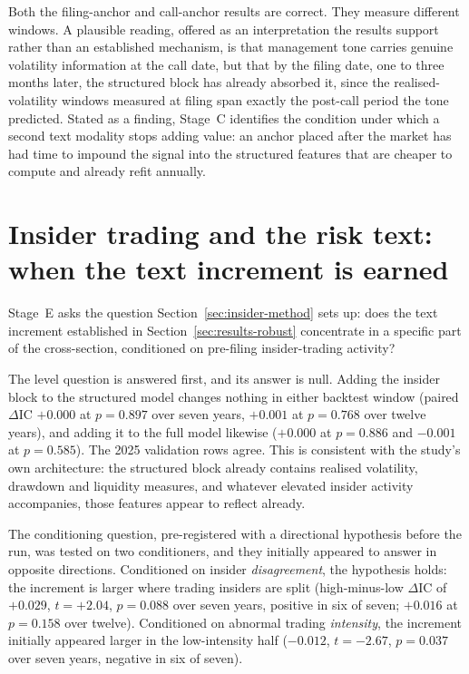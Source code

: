 \documentclass[logo,msc,ai]{infthesis}        %
\begin{document}
Both the filing-anchor and call-anchor results are correct. They measure different windows. A plausible reading, offered as an interpretation the results support rather than an established mechanism, is that management tone carries genuine volatility information at the call date, but that by the filing date, one to three months later, the structured block has already absorbed it, since the realised-volatility windows measured at filing span exactly the post-call period the tone predicted. Stated as a finding, Stage~C identifies the condition under which a second text modality stops adding value: an anchor placed after the market has had time to impound the signal into the structured features that are cheaper to compute and already refit annually.

\section{Insider trading and the risk text: when the text increment is earned}
\label{sec:results-insider}
Stage~E asks the question Section~\ref{sec:insider-method} sets up: does the text increment established in Section~\ref{sec:results-robust} concentrate in a specific part of the cross-section, conditioned on pre-filing insider-trading activity?

The level question is answered first, and its answer is null. Adding the insider block to the structured model changes nothing in either backtest window (paired $\Delta$IC $+0.000$ at $p=0.897$ over seven years, $+0.001$ at $p=0.768$ over twelve years), and adding it to the full model likewise ($+0.000$ at $p=0.886$ and $-0.001$ at $p=0.585$). The 2025 validation rows agree. This is consistent with the study's own architecture: the structured block already contains realised volatility, drawdown and liquidity measures, and whatever elevated insider activity accompanies, those features appear to reflect already.

The conditioning question, pre-registered with a directional hypothesis before the run, was tested on two conditioners, and they initially appeared to answer in opposite directions. Conditioned on insider \emph{disagreement}, the hypothesis holds: the increment is larger where trading insiders are split (high-minus-low $\Delta$IC of $+0.029$, $t=+2.04$, $p=0.088$ over seven years, positive in six of seven; $+0.016$ at $p=0.158$ over twelve). Conditioned on abnormal trading \emph{intensity}, the increment initially appeared larger in the low-intensity half ($-0.012$, $t=-2.67$, $p=0.037$ over seven years, negative in six of seven).
\end{document}
